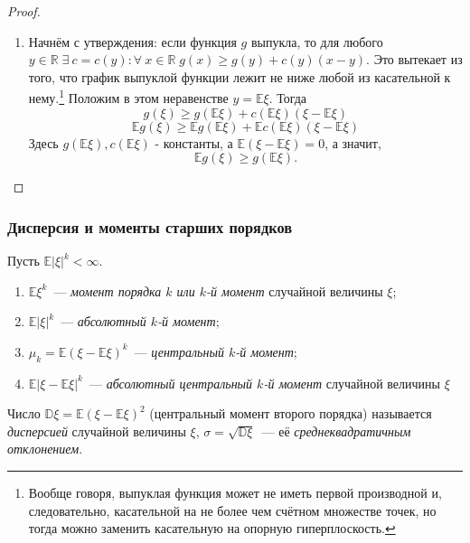 \begin{proof}
\begin{enumerate}
    \item 
        Начнём с утверждения: если функция $g$ выпукла, то для любого ${y \in \mathbb{R}} \; {\exists \: c = c(y) \colon} \forall \: x \in \mathbb{R} \; g(x) \geqslant g(y) + c(y)(x - y)$. 
        Это вытекает из того, что график выпуклой функции лежит не ниже любой из касательной к нему.\footnote{Вообще говоря, выпуклая функция может не иметь первой производной и, следовательно, касательной на не более чем счётном множестве точек, но тогда можно заменить касательную на опорную гиперплоскость.} 
        Положим в этом неравенстве $y = \mathbb{E}\xi$. 
        Тогда
        $$ g(\xi) \geqslant g(\mathbb{E}\xi) + c(\mathbb{E}\xi)(\xi - \mathbb{E}\xi) $$
        $$ \mathbb{E}g(\xi) \geqslant \mathbb{E}g(\mathbb{E}\xi) +  \mathbb{E}c(\mathbb{E}\xi)(\xi - \mathbb{E}\xi)$$
        Здесь $g(\mathbb{E}\xi), c(\mathbb{E}\xi)$ - константы, а $\mathbb{E}(\xi - \mathbb{E}\xi) = 0$, а значит,
        $$ \mathbb{E}g(\xi) \geqslant g(\mathbb{E}\xi).$$
\end{enumerate}
\end{proof}

\subsubsection{Дисперсия и моменты старших порядков}

\begin{defn}
    Пусть ${\mathbb{E}|\xi|^k < \infty}$. 
    \begin{enumerate}
        \item 
            ${\mathbb{E}\xi^k}$~--- \textit{момент порядка $k$ или $k$-й момент} случайной величины $\xi$;
        \item 
            ${\mathbb{E}|\xi|^k}$~--- \textit{абсолютный $k$-й момент};
        \item 
            $\mu_k = {\mathbb{E}(\xi - \mathbb{E}\xi)^k}$~--- \textit{центральный $k$-й момент};
        \item 
            ${\mathbb{E}|\xi - \mathbb{E}\xi|^k}$~--- \textit{абсолютный центральный $k$-й момент} случайной величины $\xi$
    \end{enumerate}
\end{defn}

\begin{defn}
    Число $\mathbb{D}\xi = \mathbb{E}(\xi - \mathbb{E}\xi)^2$ (центральный момент второго порядка) называется \textit{дисперсией} случайной величины $\xi$, $\sigma = \sqrt{\mathbb{D}\xi}$~--- её \textit{среднеквадратичным отклонением}.
\end{defn} 

